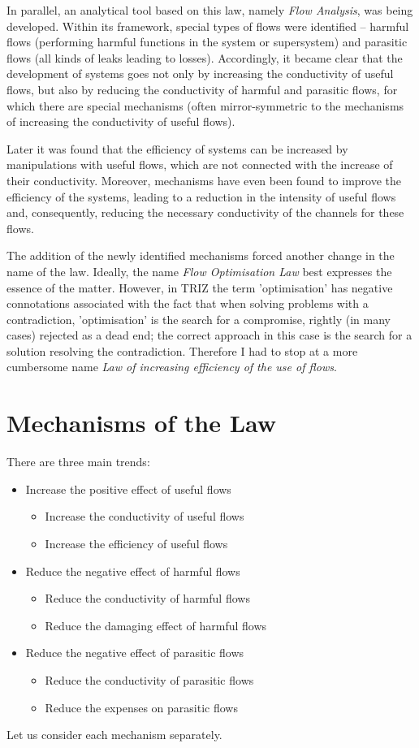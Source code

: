 \documentclass[a4paper,11pt]{article}
\begin{document}
In parallel, an analytical tool based on this law, namely \emph{Flow
  Analysis}, was being developed. Within its framework, special types of flows
were identified -- harmful flows (performing harmful functions in the system
or supersystem) and parasitic flows (all kinds of leaks leading to losses).
Accordingly, it became clear that the development of systems goes not only by
increasing the conductivity of useful flows, but also by reducing the
conductivity of harmful and parasitic flows, for which there are special
mechanisms (often mirror-symmetric to the mechanisms of increasing the
conductivity of useful flows).

Later it was found that the efficiency of systems can be increased by
manipulations with useful flows, which are not connected with the increase of
their conductivity. Moreover, mechanisms have even been found to improve the
efficiency of the systems, leading to a reduction in the intensity of useful
flows and, consequently, reducing the necessary conductivity of the channels
for these flows.

The addition of the newly identified mechanisms forced another change in the
name of the law. Ideally, the name \emph{Flow Optimisation Law} best expresses
the essence of the matter. However, in TRIZ the term 'optimisation' has
negative connotations associated with the fact that when solving problems with
a contradiction, 'optimisation' is the search for a compromise, rightly (in
many cases) rejected as a dead end; the correct approach in this case is the
search for a solution resolving the contradiction. Therefore I had to stop at
a more cumbersome name \emph{Law of increasing efficiency of the use of
  flows}.

\section*{Mechanisms of the Law}

There are three main trends:
\begin{itemize}
\item Increase the positive effect of useful flows
  \begin{itemize}
  \item Increase the conductivity of useful flows
  \item Increase the efficiency of useful flows
  \end{itemize}
\item Reduce the negative effect of harmful flows
  \begin{itemize}
  \item Reduce the conductivity of harmful flows
  \item Reduce the damaging effect of harmful flows
  \end{itemize}
\item Reduce the negative effect of parasitic flows
  \begin{itemize}
  \item Reduce the conductivity of parasitic flows
  \item Reduce the expenses on parasitic flows
  \end{itemize}
\end{itemize}
Let us consider each mechanism separately.
\end{document}
